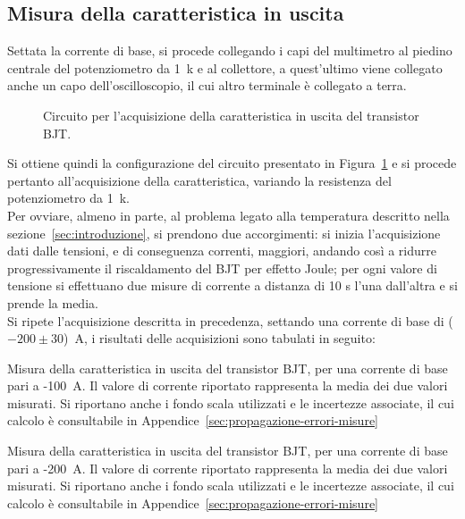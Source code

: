 \documentclass[../main.tex]{subfiles}
\begin{document}
    \subsection*{Misura della caratteristica in uscita}
    Settata la corrente di base, si procede collegando i capi del multimetro al piedino
    centrale del potenziometro da 1~k\textohm\; e al collettore, a quest'ultimo
    viene collegato anche un capo dell'oscilloscopio, il cui altro terminale è collegato a terra.
    \begin{figure}[h!]
        \centering
        
        \caption{Circuito per l'acquisizione della caratteristica in uscita del transistor BJT.}
        \label{fig:circuito-caratteristica}
    \end{figure}

    \noindent Si ottiene quindi la configurazione del circuito presentato in Figura~\ref{fig:circuito-caratteristica}
    e si procede pertanto all'acquisizione della caratteristica, variando la
    resistenza del potenziometro da 1~k\textohm. \\

    Per ovviare, almeno in parte, al problema legato alla
    temperatura descritto nella sezione~\ref{sec:introduzione},
    si prendono due accorgimenti:
    si inizia l'acquisizione dati dalle tensioni, e di
    conseguenza correnti, maggiori, andando così a ridurre
    progressivamente il riscaldamento del BJT per effetto Joule;
    per ogni valore di tensione si effettuano due misure
    di corrente a distanza di 10 s l'una dall'altra e si prende la
    media.\\

    Si ripete l'acquisizione descritta in precedenza, settando una corrente di base
    di ($-200 \pm 30$)~\textmu A, i risultati delle acquisizioni sono tabulati in seguito:
    \clearpage
    \begin{table}[!ht]
        \centering
        
        \captionsetup{justification=centering} %
        \caption{Misura della caratteristica in uscita del transistor BJT, per una corrente di base pari a -100~\textmu A. Il
        valore di corrente riportato rappresenta la media dei due valori misurati. Si
        riportano anche i fondo scala utilizzati e le incertezze associate, il cui calcolo
        è consultabile in Appendice~\ref{sec:propagazione-errori-misure}}
        \label{tab:100uA}

    \end{table}
    \begin{table}[!ht]
        \centering
        
        \captionsetup{justification=centering} %
        \caption{Misura della caratteristica in uscita del transistor BJT, per una corrente di base pari a -200~\textmu A. Il
        valore di corrente riportato rappresenta la media dei due valori misurati. Si
        riportano anche i fondo scala utilizzati e le incertezze associate, il cui calcolo
        è consultabile in Appendice~\ref{sec:propagazione-errori-misure}}
        \label{tab:200uA}

    \end{table}
\end{document}
